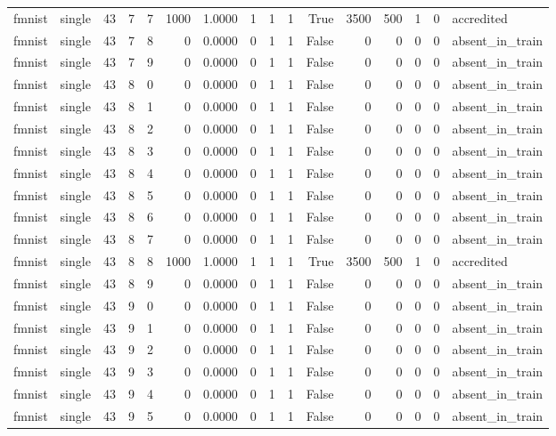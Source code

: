 \begin{tabular}{llrrrrrrrrrrrrrl}
fmnist & single & 43 & 7 & 7 & 1000 & 1.0000 & 1 & 1 & 1 & True & 3500 & 500 & 1 & 0 & accredited \\
fmnist & single & 43 & 7 & 8 & 0 & 0.0000 & 0 & 1 & 1 & False & 0 & 0 & 0 & 0 & absent\_in\_train \\
fmnist & single & 43 & 7 & 9 & 0 & 0.0000 & 0 & 1 & 1 & False & 0 & 0 & 0 & 0 & absent\_in\_train \\
fmnist & single & 43 & 8 & 0 & 0 & 0.0000 & 0 & 1 & 1 & False & 0 & 0 & 0 & 0 & absent\_in\_train \\
fmnist & single & 43 & 8 & 1 & 0 & 0.0000 & 0 & 1 & 1 & False & 0 & 0 & 0 & 0 & absent\_in\_train \\
fmnist & single & 43 & 8 & 2 & 0 & 0.0000 & 0 & 1 & 1 & False & 0 & 0 & 0 & 0 & absent\_in\_train \\
fmnist & single & 43 & 8 & 3 & 0 & 0.0000 & 0 & 1 & 1 & False & 0 & 0 & 0 & 0 & absent\_in\_train \\
fmnist & single & 43 & 8 & 4 & 0 & 0.0000 & 0 & 1 & 1 & False & 0 & 0 & 0 & 0 & absent\_in\_train \\
fmnist & single & 43 & 8 & 5 & 0 & 0.0000 & 0 & 1 & 1 & False & 0 & 0 & 0 & 0 & absent\_in\_train \\
fmnist & single & 43 & 8 & 6 & 0 & 0.0000 & 0 & 1 & 1 & False & 0 & 0 & 0 & 0 & absent\_in\_train \\
fmnist & single & 43 & 8 & 7 & 0 & 0.0000 & 0 & 1 & 1 & False & 0 & 0 & 0 & 0 & absent\_in\_train \\
fmnist & single & 43 & 8 & 8 & 1000 & 1.0000 & 1 & 1 & 1 & True & 3500 & 500 & 1 & 0 & accredited \\
fmnist & single & 43 & 8 & 9 & 0 & 0.0000 & 0 & 1 & 1 & False & 0 & 0 & 0 & 0 & absent\_in\_train \\
fmnist & single & 43 & 9 & 0 & 0 & 0.0000 & 0 & 1 & 1 & False & 0 & 0 & 0 & 0 & absent\_in\_train \\
fmnist & single & 43 & 9 & 1 & 0 & 0.0000 & 0 & 1 & 1 & False & 0 & 0 & 0 & 0 & absent\_in\_train \\
fmnist & single & 43 & 9 & 2 & 0 & 0.0000 & 0 & 1 & 1 & False & 0 & 0 & 0 & 0 & absent\_in\_train \\
fmnist & single & 43 & 9 & 3 & 0 & 0.0000 & 0 & 1 & 1 & False & 0 & 0 & 0 & 0 & absent\_in\_train \\
fmnist & single & 43 & 9 & 4 & 0 & 0.0000 & 0 & 1 & 1 & False & 0 & 0 & 0 & 0 & absent\_in\_train \\
fmnist & single & 43 & 9 & 5 & 0 & 0.0000 & 0 & 1 & 1 & False & 0 & 0 & 0 & 0 & absent\_in\_train \\

\end{tabular}
